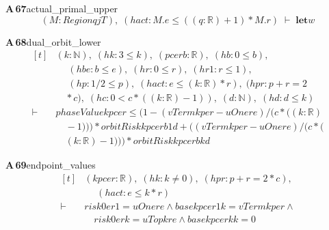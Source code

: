 \documentclass[conference]{IEEEtran}
\theoremstyle{definition}
\newcommand{\lean}[1]{\textsf{\footnotesize #1}}
\begin{document}
\noindent\textbf{A\,67}\quad\lean{actual\_primal\_upper}
{\footnotesize\[ (\mathit{M} : \mathit{Region} \mathit{q} \mathit{j} \mathit{T}),\; (\mathit{hact} : \mathit{M}.\mathit{e} \leq ((\mathit{q}:\mathbb{R} )+1)*\mathit{M}.\mathit{r}) \;\vdash\; \mathbf{let} \mathit{w} \]}

\noindent\textbf{A\,68}\quad\lean{dual\_orbit\_lower}
{\footnotesize\[ \begin{aligned}[t]
&(\mathit{k} : \mathbb{N} ),\; (\mathit{hk} : 3 \leq \mathit{k}),\; (\mathit{p} \mathit{c} \mathit{e} \mathit{r} \mathit{b} : \mathbb{R} ),\; (\mathit{hb} : 0 \leq \mathit{b}),\\
&\quad \; (\mathit{hbe} : \mathit{b} \leq \mathit{e}),\; (\mathit{hr} : 0 \leq \mathit{r}),\; (\mathit{hr1} : \mathit{r} \leq 1),\\
&\quad \; (\mathit{hp} : 1/2 \leq \mathit{p}),\; (\mathit{hact} : \mathit{e} \leq (\mathit{k}:\mathbb{R} )*\mathit{r}),\; (\mathit{hpr} : \mathit{p}+\mathit{r}=2\\
&\quad *\mathit{c}),\; (\mathit{hc} : 0 < \mathit{c}*((\mathit{k}:\mathbb{R} )-1)),\; (\mathit{d} : \mathbb{N} ),\; (\mathit{hd} : \mathit{d} \leq \mathit{k})\\
\vdash\;&\mathit{phaseValue} \mathit{k} \mathit{p} \mathit{c} \mathit{e} \mathit{r} \leq (1-(\mathit{vTerm} \mathit{k} \mathit{p} \mathit{e} \mathit{r}-\mathit{uOne} \mathit{r} \mathit{e})/(\mathit{c}*((\mathit{k}:\mathbb{R} )\\
&\quad -1)))*\mathit{orbitRisk} \mathit{k} \mathit{p} \mathit{c} \mathit{e} \mathit{r} \mathit{b} 1 \mathit{d}+ ((\mathit{vTerm} \mathit{k} \mathit{p} \mathit{e} \mathit{r}-\mathit{uOne} \mathit{r} \mathit{e})/(\mathit{c}*(\\
&\quad (\mathit{k}:\mathbb{R} )-1)))*\mathit{orbitRisk} \mathit{k} \mathit{p} \mathit{c} \mathit{e} \mathit{r} \mathit{b} \mathit{k} \mathit{d}
\end{aligned} \]}

\noindent\textbf{A\,69}\quad\lean{endpoint\_values}
{\footnotesize\[ \begin{aligned}[t]
&(\mathit{k} \mathit{p} \mathit{c} \mathit{e} \mathit{r} : \mathbb{R} ),\; (\mathit{hk} : \mathit{k} \neq 0),\; (\mathit{hpr} : \mathit{p}+\mathit{r}=2*\mathit{c}),\\
&\quad \; (\mathit{hact} : \mathit{e} \leq \mathit{k}*\mathit{r})\\
\vdash\;&\mathit{risk0} \mathit{e} \mathit{r} 1=\mathit{uOne} \mathit{r} \mathit{e} \wedge \mathit{base} \mathit{k} \mathit{p} \mathit{c} \mathit{e} \mathit{r} 1 \mathit{k}=\mathit{vTerm} \mathit{k} \mathit{p} \mathit{e} \mathit{r} \wedge\\
&\quad \mathit{risk0} \mathit{e} \mathit{r} \mathit{k}=\mathit{uTop} \mathit{k} \mathit{r} \mathit{e} \wedge \mathit{base} \mathit{k} \mathit{p} \mathit{c} \mathit{e} \mathit{r} \mathit{k} \mathit{k}=0
\end{aligned} \]}
\end{document}
